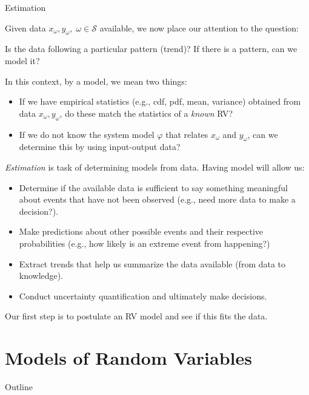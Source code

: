\documentclass[handout,9pt]{beamer}
\begin{document}
%
\begin{frame}{Estimation}

Given data $x_\omega, y_\omega,\; \omega \in \mathcal{S}$ available, we now place our attention to the question:
\begin{block}{}
Is the data following a particular pattern (trend)? If there is a pattern, can we model it? 
\end{block}
In this context, by a model, we mean two things: 
\begin{itemize}
 \setlength{\itemsep}{5pt}
\item If we have empirical statistics (e.g., cdf, pdf, mean, variance) obtained from data $x_\omega,y_\omega$, do these match the statistics of a {\em known} RV?
\item If we do not know the system model $\varphi$ that relates $x_\omega$ and $y_\omega$, can we determine this by using input-output data? 
\end{itemize}
{\em Estimation} is task of determining models from data.  Having model will allow us:
\begin{block}{}
\begin{itemize}
\item Determine if the available data is sufficient to say something meaningful about events that have not been observed (e.g., need more data to make a decision?). 
\item Make predictions about other possible events and their respective probabilities (e.g., how likely is an extreme event from happening?)
\item Extract trends that help us summarize the data available (from data to knowledge). 
\item Conduct uncertainty quantification and ultimately make decisions. 
\end{itemize}
\end{block}
Our first step is to postulate an RV model and see if this fits the data. 
\end{frame}

\section{Models of Random Variables}
\begin{frame}{Outline}
\tableofcontents[currentsection]
\end{frame}
\end{document}
